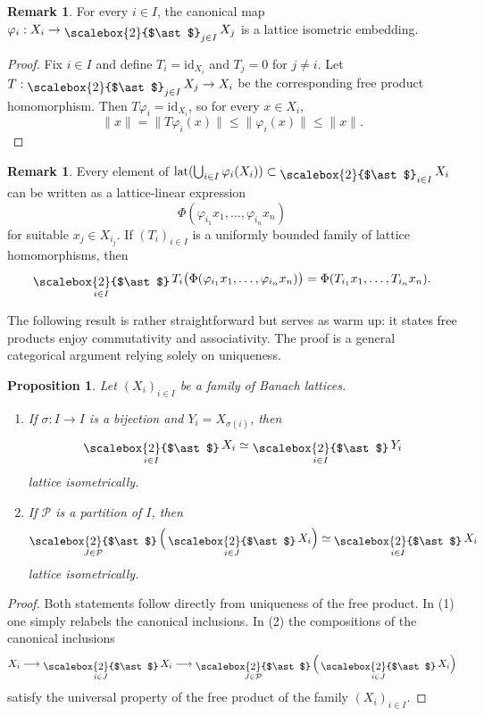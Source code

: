 \documentclass[12pt]{amsart}
\DeclareMathOperator{\lat}{lat}
\DeclareMathOperator*{\bigfree}{\raisebox{-0.6ex}{\scalebox{2}{$\ast$}}}
\theoremstyle{plain}
\newtheorem{proposition}[theorem]{Proposition}
\theoremstyle{definition}
\newtheorem{remark}[theorem]{Remark}
\begin{document}
\begin{remark}\label{rem:isometric-copies}
For every $i\in I$, the canonical map $\varphi_i:X_i\to \bigfree_{j\in I}X_j$ is a lattice isometric embedding.
\end{remark}

\begin{proof}
Fix $i\in I$ and define $T_i=\mathrm{id}_{X_i}$ and $T_j=0$ for $j\neq i$. Let $T:\bigfree_{j\in I}X_j\to X_i$ be the corresponding free product homomorphism. Then $T\varphi_i=\mathrm{id}_{X_i}$, so for every $x\in X_i$,
\[
\|x\|=\|T\varphi_i(x)\|\leq \|\varphi_i(x)\|\leq \|x\|.
\]
\end{proof}



\begin{remark}\label{rem:bigfree-formula}
Every element of $\lat(\bigcup_{i\in I}\varphi_i(X_i))\subset \bigfree_{i\in I}X_i$ can be written as a lattice-linear expression
\[
\Phi(\varphi_{i_1}x_1,\ldots,\varphi_{i_n}x_n)
\]
for suitable $x_j\in X_{i_j}$. If $(T_i)_{i\in I}$ is a uniformly bounded family of lattice homomorphisms, then
\[
\bigfree_{i\in I}T_i\bigl(\Phi(\varphi_{i_1}x_1,\ldots,\varphi_{i_n}x_n)\bigr)
=
\Phi(T_{i_1}x_1,\ldots,T_{i_n}x_n).
\]
\end{remark}

The following result is rather straightforward but serves as warm up: it states free products enjoy commutativity and associativity. The proof is a general categorical argument relying solely on uniqueness.

\begin{proposition}
Let $(X_i)_{i\in I}$ be a family of Banach lattices.

\begin{enumerate}
\item If $\sigma:I\to I$ is a bijection and $Y_i=X_{\sigma(i)}$, then
\[
\bigfree_{i\in I} X_i \simeq \bigfree_{i\in I} Y_i
\]
lattice isometrically.
\item If $\mathcal{P}$ is a partition of $I$, then
\[
\bigfree_{J\in \mathcal{P}}\Big(\bigfree_{i\in J} X_i\Big)\simeq \bigfree_{i\in I} X_i
\]
lattice isometrically.
\end{enumerate}
\end{proposition}

\begin{proof}
Both statements follow directly from uniqueness of the free product. In (1) one simply relabels the canonical inclusions. In (2) the compositions of the canonical inclusions
\[
X_i\longrightarrow \bigfree_{i\in J}X_i \longrightarrow \bigfree_{J\in\mathcal{P}}\Big(\bigfree_{i\in J}X_i\Big)
\]
satisfy the universal property of the free product of the family $(X_i)_{i\in I}$.
\end{proof}
\end{document}
